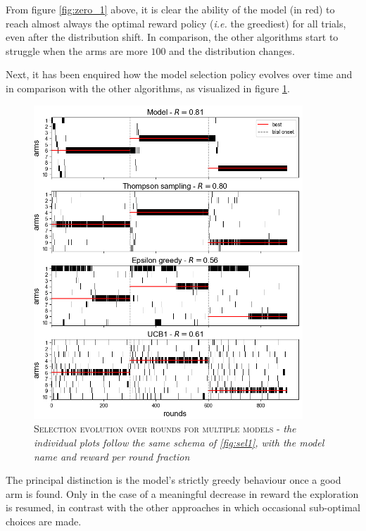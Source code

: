 \noindent From figure \ref{fig:zero_1} above, it is clear the ability of the model (in red) to reach almost always the optimal reward policy (\textit{i.e.} the greediest) for all trials, even after the distribution shift.
In comparison, the other algorithms start to struggle when the arms are more $100$ and the distribution changes.

Next, it has been enquired how the model selection policy evolves over time and in comparison with the other algorithms, as visualized in figure \ref{fig:sel2}.

\begin{figure}[ht]
    \centering
    \includegraphics[width=0.9\textwidth]{figures/selections_many.png}
    \caption{\textsc{Selection evolution over rounds for multiple models} - \textit{the individual plots follow the same schema of \ref{fig:sel1}, with the model name and reward per round fraction}}
    \label{fig:sel2}
\end{figure}

\noindent The principal distinction is the model's strictly greedy behaviour once a good arm is found. Only in the case of a meaningful decrease in reward the exploration is resumed, in contrast with the other approaches in which occasional sub-optimal choices are made.


